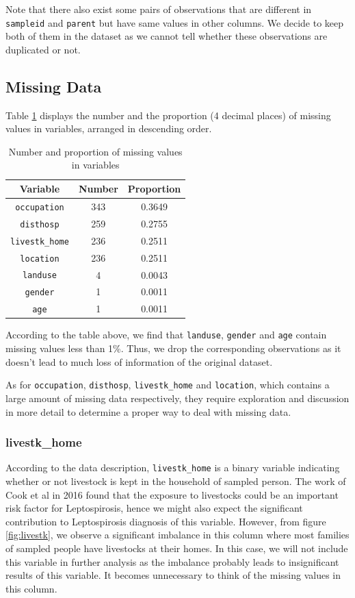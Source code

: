 \documentclass[11pt,twoside]{article}
\numberwithin{Theorem}{section}
\numberwithin{Definition}{section}
\numberwithin{Lemma}{section}
\numberwithin{Algorithm}{section}
\numberwithin{equation}{section}
\begin{document}
Note that there also exist some pairs of observations that are different in \texttt{sampleid} and \texttt{parent} but have same values in other columns. We decide to keep both of them in the dataset as we cannot tell whether these observations are duplicated or not.  

\subsection{Missing Data}

Table \ref{tab:missing} displays the number and the proportion (4 decimal places) of missing values in variables, arranged in descending order. 

\begin{table}[!h]
	\centering
	\begin{tabular}{|c|c|c|}
		\hline
		Variable & Number & Proportion \\
		\hline
		\texttt{occupation} & 343 & 0.3649 \\ 
		\texttt{disthosp} &259 & 0.2755 \\
		\texttt{livestk\_home}  &  236 & 0.2511 \\
        \texttt{location}  &  236 & 0.2511 \\
		\texttt{landuse} & 4 & 0.0043 \\
		\texttt{gender} & 1 & 0.0011 \\
		\texttt{age} & 1 & 0.0011 \\
		\hline
	\end{tabular}
	\caption{Number and proportion of missing values in variables}
	\label{tab:missing}
\end{table}

According to the table above, we find that \texttt{landuse}, \texttt{gender} and \texttt{age} contain missing values less than 1\%. Thus, we drop the corresponding observations as it doesn't lead to much loss of information of the original dataset.

As for \texttt{occupation}, \texttt{disthosp}, \texttt{livestk\_home} and \texttt{location}, which contains a large amount of missing data respectively, they require exploration and discussion in more detail to determine a proper way to deal with missing data.

\subsubsection{livestk\_home}

According to the data description, \texttt{livestk\_home} is a binary variable indicating whether or not livestock is kept in the household of sampled person. The work of Cook et al in 2016 \cite{cook2016} found that the exposure to livestocks could be an important risk factor for Leptospirosis, hence we might also expect the significant contribution to Leptospirosis diagnosis of this variable. However, from figure \ref{fig:livestk}, we observe a significant imbalance in this column where most families of sampled people have livestocks at their homes. In this case, we will not include this variable in further analysis as the imbalance probably leads to insignificant results of this variable. It becomes unnecessary to think of the missing values in this column.
\end{document}
